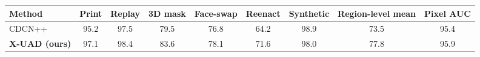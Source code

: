 \begin{tabular}{lcccccccc}
\toprule
Method & Print & Replay & 3D mask & Face-swap & Reenact & Synthetic & Region-level mean & Pixel AUC \\
\midrule
CDCN++~\cite{yu2020cdcn} & 95.2 & 97.5 & 79.5 & 76.8 & 64.2 & 98.9 & 73.5 & 95.4 \\
\textbf{X-UAD (ours)} & 97.1 & 98.4 & 83.6 & 78.1 & 71.6 & 98.0 & 77.8 & 95.9 \\
\bottomrule
\end{tabular}